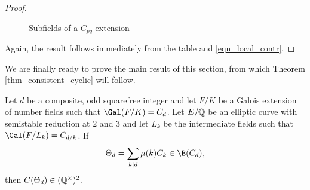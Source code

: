 \begin{proof}
\begin{figure}[!ht]
        \caption[short]{Subfields of a $C_{pq}$-extension}
    \end{figure}

    Again, the result follows immediately from the table and \eqref{eqn_local_contr}.
    
\end{proof}

We are finally ready to prove the main result of this section, from which Theorem \ref{thm_consistent_cyclic} will follow. 

\begin{lemma}\label{lem_Cd_odd}
    Let $d$ be a composite, odd squarefree integer and let $F/K$ be a Galois extension of number fields such that $\Gal(F/K)=C_{d}$. Let $E/\mathbb{Q}$ be an elliptic curve with semistable reduction at $2$ and $3$ and let $L_k$ be the intermediate fields such that $\Gal(F/L_k)=C_{d/k}$. If 
    $$\Theta_d=\sum_{k\mid d}\mu(k)C_k\in \B(C_d),$$
    then $C(\Theta_d)\in(\mathbb{Q}^{\times})^2$.
\end{lemma}

